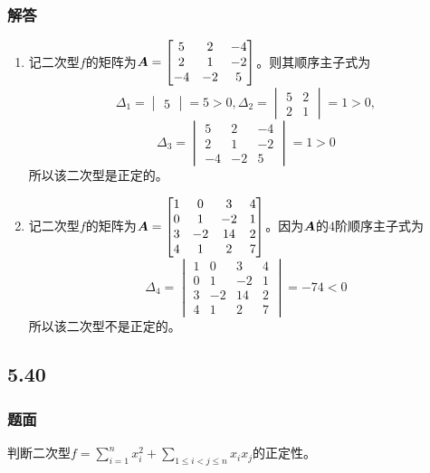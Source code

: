 \documentclass{beamer}
\begin{document}
\begin{frame}[allowframebreaks]
    \frametitle{解答}
    \begin{enumerate}
        \item {
              记二次型\(f\)的矩阵为\(\boldsymbol{A}=\begin{bmatrix}5&2&-4\\2&1&-2\\-4&-2&5\end{bmatrix}\)。则其顺序主子式为
              \begin{equation*}
                  \Delta_1=\begin{vmatrix}5\end{vmatrix}=5>0,\Delta_2=\begin{vmatrix}5&2\\2&1\end{vmatrix}=1>0,
              \end{equation*}
              \begin{equation*}
                  \Delta_3=\begin{vmatrix}5&2&-4\\2&1&-2\\-4&-2&5\end{vmatrix}=1>0
              \end{equation*}
              所以该二次型是正定的。
              }
        \item {
              记二次型\(f\)的矩阵为\(\boldsymbol{A}=\begin{bmatrix}1&0&3&4\\0&1&-2&1\\3&-2&14&2\\4&1&2&7\end{bmatrix}\)。因为\(\boldsymbol{A}\)的\(4\)阶顺序主子式为
              \begin{equation*}
                  \Delta_4=\begin{vmatrix}1&0&3&4\\0&1&-2&1\\3&-2&14&2\\4&1&2&7\end{vmatrix}=-74<0
              \end{equation*}
              所以该二次型不是正定的。
              }
    \end{enumerate}
\end{frame}

\subsection*{5.40}
\begin{frame}
    \frametitle{题面}
    判断二次型\(f=\sum_{i=1}^nx_i^2+\sum_{1\le i<j\le n}x_ix_j\)的正定性。
\end{frame}
\end{document}
